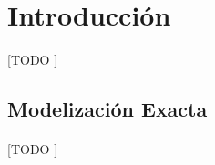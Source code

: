 \documentclass[spanish]{article}
\begin{document}
	\maketitle %

	\thispagestyle{fancy} %



	\begin{abstract}
		\noindent [TODO ]
	\end{abstract}


	\section{Introducción}
	\label{sec:intro}

		\paragraph{}
		[TODO ]

		\subsection{Modelización Exacta}
		\label{sec:exact_formulation}

			\paragraph{}
			[TODO ]
\end{document}
